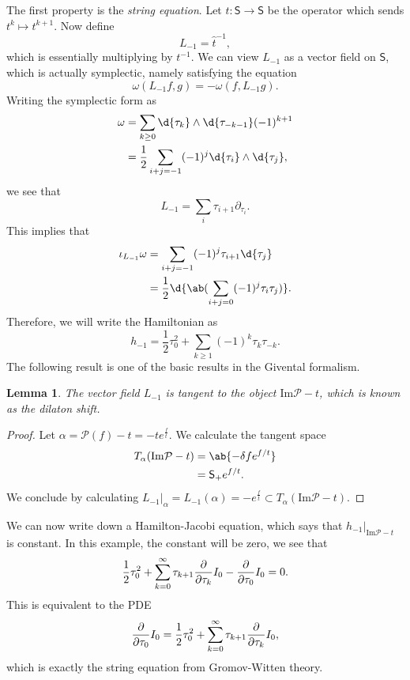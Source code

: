 \documentclass{amsart}
\newtheorem{lem}[thm]{Lemma}
\theoremstyle{definition}
\theoremstyle{remark}
\theoremstyle{plain}
\theoremstyle{definition}
\theoremstyle{remark}
\newcommand{\Ima}{\mathrm{Im}}
\newcommand{\mc}[1]{\mathcal{#1}}
\newcommand{\ms}[1]{\mathsf{#1}}
\newcommand{\1}{\mathbf{1}}
\newcommand{\2}{\mathbf{2}}
\newcommand{\3}{\mathbf{3}}
\begin{document}
The first property is the \textit{string equation}. Let \(\hat{t} \colon \ms{S} \to \ms{S}\) be the operator which sends \(t^k \mapsto t^{k+1}\). Now define
\[ L_{-1} = \hat{t}^{-1}, \]
which is essentially multiplying by \(t^{-1}\). We can view \(L_{-1}\) as a vector field on \(\ms{S}\), which is actually symplectic, namely satisfying the equation
\[ \omega(L_{-1} f, g) = - \omega(f, L_{-1} g). \]
Writing the symplectic form as
\begin{align*}
    \omega &= \sum_{k \geq 0} \d{\tau_k} \wedge \d{\tau_{-k-1}} (-1)^{k+1} \\
    &= \frac{1}{2} \sum_{i+j=-1} (-1)^{j} \d{\tau_i} \wedge \d{\tau_j},
\end{align*}
we see that
\[ L_{-1} = \sum_i \tau_{i+1} \partial_{\tau_i}. \]
This implies that
\begin{align*}
    \iota_{L_{-1}} \omega &= \sum_{i+j=-1} (-1)^j \tau_{i+1} \d{\tau_j} \\
    &= \frac{1}{2} \d{\ab(\sum_{i+j=0} (-1)^j \tau_i \tau_j)}.
\end{align*}
Therefore, we will write the Hamiltonian as
\[ h_{-1} = \frac{1}{2} \tau_0^2 + \sum_{k \geq 1} (-1)^k \tau_k \tau_{-k}. \]
The following result is one of the basic results in the Givental formalism.

\begin{lem}
    The vector field \(L_{-1}\) is tangent to the object \(\Ima\mc{P} - t\), which is known as the \textit{dilaton shift}.
\end{lem}

\begin{proof}
    Let \(\alpha = \mc{P}(f) - t = -t e^{\frac{f}{t}}\). We calculate the tangent space
    \begin{align*}
        T_{\alpha} (\Ima\mc{P} - t) &= \ab\{ - \delta f e^{f/t} \} \\
        &= \ms{S}_+ e^{f/t}.
    \end{align*}
    We conclude by calculating \(L_{-1}|_{\alpha} = L_{-1}(\alpha) = - e^{\frac{f}{t}} \subset T_{\alpha} (\Ima\mc{P} - t)\).
\end{proof}

We can now write down a Hamilton-Jacobi equation, which says that \(h_{-1}|_{\Ima\mc{P} - t}\) is constant. In this example, the constant will be zero, we see that
\begin{align*}
    \frac{1}{2} \tau_0^2 + \sum_{k = 0}^{\infty} \tau_{k+1} \pdv{}{\tau_k} I_0 - \pdv{}{\tau_0} I_0 = 0.
\end{align*}
This is equivalent to the PDE
\[ \pdv{}{\tau_0} I_0 = \frac{1}{2} \tau_0^2 + \sum_{k = 0}^{\infty} \tau_{k+1} \pdv{}{\tau_k} I_0, \]
which is exactly the string equation from Gromov-Witten theory.
\end{document}
